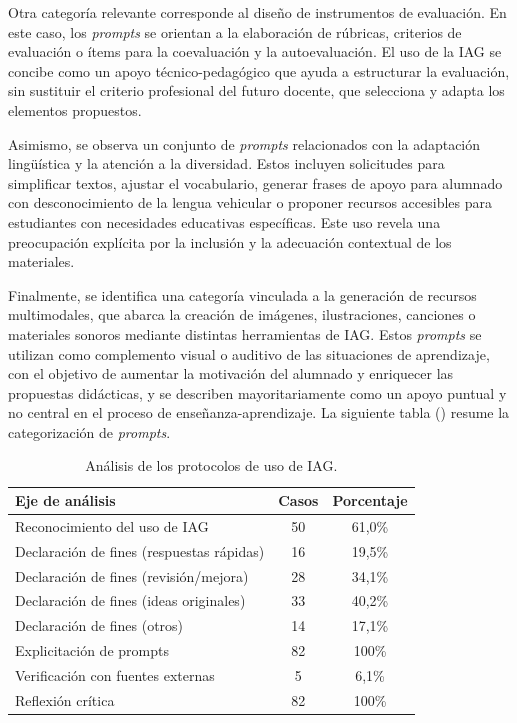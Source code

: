 \documentclass[spanish]{textolivre}
\begin{document}
Otra categoría relevante corresponde al diseño de instrumentos de evaluación. En este caso, los \textit{prompts} se orientan a la elaboración de rúbricas, criterios de evaluación o ítems para la coevaluación y la autoevaluación. El uso de la IAG se concibe como un apoyo técnico-pedagógico que ayuda a estructurar la evaluación, sin sustituir el criterio profesional del futuro docente, que selecciona y adapta los elementos propuestos.

Asimismo, se observa un conjunto de \textit{prompts} relacionados con la adaptación lingüística y la atención a la diversidad. Estos incluyen solicitudes para simplificar textos, ajustar el vocabulario, generar frases de apoyo para alumnado con desconocimiento de la lengua vehicular o proponer recursos accesibles para estudiantes con necesidades educativas específicas. Este uso revela una preocupación explícita por la inclusión y la adecuación contextual de los materiales.

Finalmente, se identifica una categoría vinculada a la generación de recursos multimodales, que abarca la creación de imágenes, ilustraciones, canciones o materiales sonoros mediante distintas herramientas de IAG. Estos \textit{prompts} se utilizan como complemento visual o auditivo de las situaciones de aprendizaje, con el objetivo de aumentar la motivación del alumnado y enriquecer las propuestas didácticas, y se describen mayoritariamente como un apoyo puntual y no central en el proceso de enseñanza-aprendizaje. La siguiente tabla () resume la categorización de \textit{prompts}.


\begin{table}[h!]
\centering
\begin{threeparttable}
\caption{Análisis de los protocolos de uso de IAG.}
\label{tab2}
\begin{tabular}{p{9cm}cc}
\toprule
\textbf{Eje de análisis} & \textbf{Casos} & \textbf{Porcentaje} \\
\midrule
Reconocimiento del uso de IAG & 50 & 61,0\% \\
Declaración de fines (respuestas rápidas) & 16 & 19,5\% \\
Declaración de fines (revisión/mejora) & 28 & 34,1\% \\
Declaración de fines (ideas originales) & 33 & 40,2\% \\
Declaración de fines (otros) & 14 & 17,1\% \\
Explicitación de prompts & 82 & 100\% \\
Verificación con fuentes externas & 5 & 6,1\% \\
Reflexión crítica & 82 & 100\% \\
\bottomrule
\end{tabular}
\end{threeparttable}
\end{table}
\end{document}
